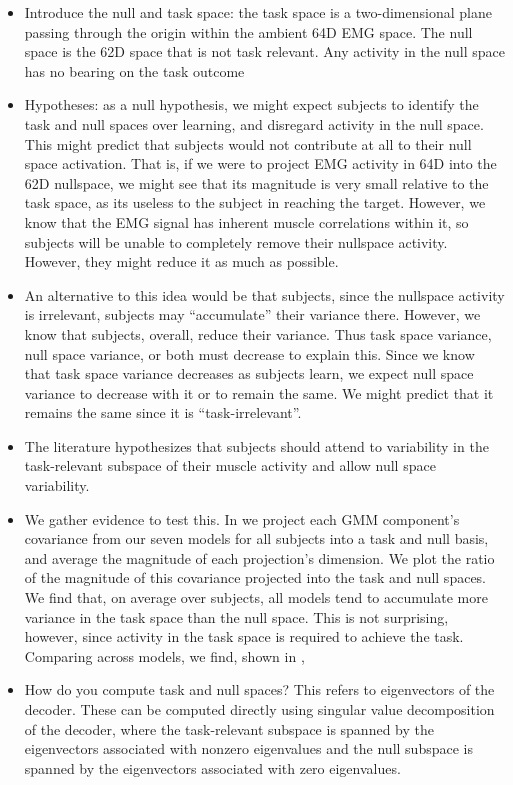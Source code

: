 \documentclass[../main.tex]{subfiles}
\begin{document}
\begin{itemize}
  \setlength\itemsep{0em}
  \item Introduce the null and task space: the task space is a two-dimensional plane passing through the origin within the ambient 64D EMG space. The null space is the 62D space that is not task relevant. Any activity in the null space has no bearing on the task outcome
  \item Hypotheses: as a null hypothesis, we might expect subjects to identify the task and null spaces over learning, and disregard activity in the null space. This might predict that subjects would not contribute at all to their null space activation. That is, if we were to project EMG activity in 64D into the 62D nullspace, we might see that its magnitude is very small relative to the task space, as its useless to the subject in reaching the target. However, we know that the EMG signal has inherent muscle correlations within it, so subjects will be unable to completely remove their nullspace activity. However, they might reduce it as much as possible.
  \item An alternative to this idea would be that subjects, since the nullspace activity is irrelevant, subjects may ``accumulate'' their variance there. However, we know that subjects, overall, reduce their variance. Thus task space variance, null space variance, or both must decrease to explain this. Since we know that task space variance decreases as subjects learn, we expect null space variance to decrease with it or to remain the same. We might predict that it remains the same since it is ``task-irrelevant''. 
  \item The literature \rbrack{} hypothesizes that subjects should attend to variability in the task-relevant subspace of their muscle activity and allow null space variability\cite{Valero-Cuevas2009}.
  \item We gather evidence to test this. In  we project each GMM component's covariance from our seven models for all subjects into a task and null basis, and average the magnitude of each projection's dimension. We plot the ratio of the magnitude of this covariance projected into the task and null spaces. We find that, on average over subjects, all models tend to accumulate more variance in the task space than the null space. This is not surprising, however, since activity in the task space is required to achieve the task. Comparing across models, we find, shown in , 
  \item How do you compute task and null spaces? This refers to eigenvectors of the decoder. These can be computed directly using singular value decomposition of the decoder, where the task-relevant subspace is spanned by the eigenvectors associated with nonzero eigenvalues and the null subspace is spanned by the eigenvectors associated with zero eigenvalues.

\end{itemize}
\end{document}
